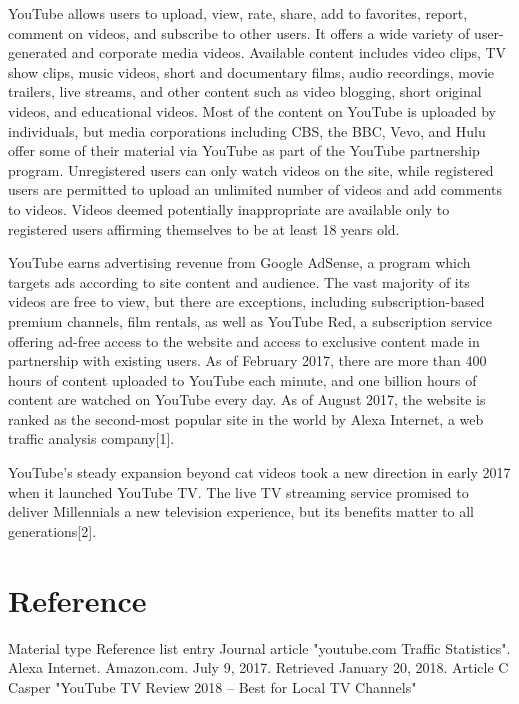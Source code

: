 \documentclass{article}                    %
\begin{document}
YouTube allows users to upload, view, rate, share, add to favorites, report, comment on videos, and subscribe to other users. It offers a wide variety of user-generated and corporate media videos. Available content includes video clips, TV show clips, music videos, short and documentary films, audio recordings, movie trailers, live streams, and other content such as video blogging, short original videos, and educational videos. Most of the content on YouTube is uploaded by individuals, but media corporations including CBS, the BBC, Vevo, and Hulu offer some of their material via YouTube as part of the YouTube partnership program. Unregistered users can only watch videos on the site, while registered users are permitted to upload an unlimited number of videos and add comments to videos. Videos deemed potentially inappropriate are available only to registered users affirming themselves to be at least 18 years old.

YouTube earns advertising revenue from Google AdSense, a program which targets ads according to site content and audience. The vast majority of its videos are free to view, but there are exceptions, including subscription-based premium channels, film rentals, as well as YouTube Red, a subscription service offering ad-free access to the website and access to exclusive content made in partnership with existing users. As of February 2017, there are more than 400 hours of content uploaded to YouTube each minute, and one billion hours of content are watched on YouTube every day. As of August 2017, the website is ranked as the second-most popular site in the world by Alexa Internet, a web traffic analysis company[1].

YouTube’s steady expansion beyond cat videos took a new direction in early 2017 when it launched YouTube TV. The live TV streaming service promised to deliver Millennials a new television experience, but its benefits matter to all generations[2].

\newpage
\section{Reference}
Material type		\bigskip 			Reference list entry
\vspace{2.00\baselineskip}
{\newline}
Journal article		\bigskip 			[1]"youtube.com Traffic Statistics". Alexa Internet. Amazon.com. July 9, 2017. 											Retrieved January 20, 2018.				
\vspace{2.00\baselineskip}
{\newline}
Article				\bigskip 		[2] C Casper "YouTube TV Review 2018 – Best for Local TV Channels"
\end{document}
